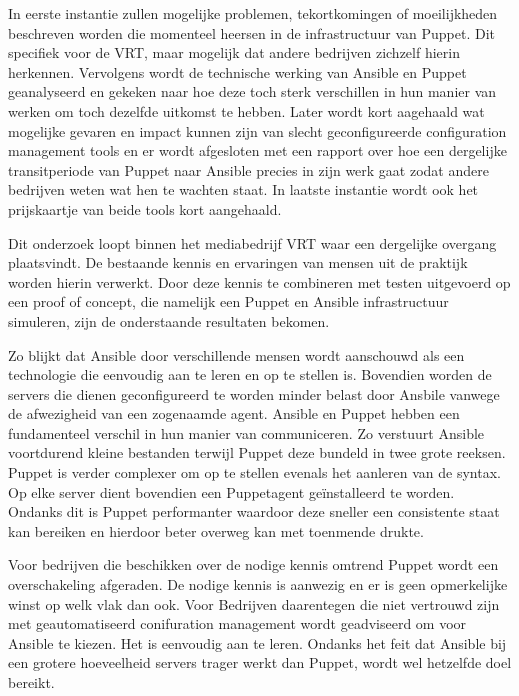 In eerste instantie zullen mogelijke problemen, tekortkomingen of moeilijkheden beschreven worden die momenteel heersen in de infrastructuur van Puppet. Dit specifiek voor de VRT, maar mogelijk dat andere bedrijven zichzelf hierin herkennen. Vervolgens wordt de technische werking van Ansible en Puppet geanalyseerd en gekeken naar hoe deze toch sterk verschillen in hun manier van werken om toch dezelfde uitkomst te hebben. Later wordt kort aagehaald wat mogelijke gevaren en impact kunnen zijn van slecht geconfigureerde configuration management tools en er wordt afgesloten met een rapport over hoe een dergelijke transitperiode van Puppet naar Ansible precies in zijn werk gaat zodat andere bedrijven weten wat hen te wachten staat. In laatste instantie wordt ook het prijskaartje van beide tools kort aangehaald.

Dit onderzoek loopt binnen het mediabedrijf VRT waar een dergelijke overgang plaatsvindt. De bestaande kennis en ervaringen van mensen uit de praktijk worden hierin verwerkt. Door deze kennis te combineren met testen uitgevoerd op een proof of concept, die namelijk een Puppet en Ansible infrastructuur simuleren, zijn de onderstaande resultaten bekomen.

Zo blijkt dat Ansible door verschillende mensen wordt aanschouwd als een technologie die eenvoudig aan te leren en op te stellen is. Bovendien worden de servers die dienen geconfigureerd te worden minder belast door Ansbile vanwege de afwezigheid van een zogenaamde agent. Ansible en Puppet hebben een fundamenteel verschil in hun manier van communiceren. Zo verstuurt Ansible voortdurend kleine bestanden terwijl Puppet deze bundeld in twee grote reeksen. Puppet is verder complexer om op te stellen evenals het aanleren van de syntax. Op elke server dient bovendien een Puppetagent ge\"installeerd te worden. Ondanks dit is Puppet performanter waardoor deze sneller een consistente staat kan bereiken en hierdoor beter overweg kan met toenmende drukte.

Voor bedrijven die beschikken over de nodige kennis omtrend Puppet wordt een overschakeling afgeraden. De nodige kennis is aanwezig en er is geen opmerkelijke winst op welk vlak dan ook. Voor Bedrijven daarentegen die niet vertrouwd zijn met geautomatiseerd conifuration management  wordt geadviseerd om voor Ansible te kiezen. Het is eenvoudig aan te leren. Ondanks het feit dat Ansible bij een grotere hoeveelheid servers trager werkt dan Puppet, wordt wel hetzelfde doel bereikt.

